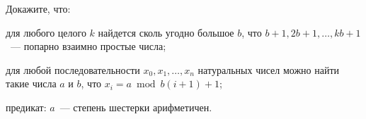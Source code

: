 Докажите, что:
\begin{enumcyr}
    \item для любого целого $k$ найдется сколь угодно большое $b$, что $b + 1, 2 b + 1, \dots, k b +
        1$~--- попарно взаимно простые числа;
    \item для любой последовательности $x_0, x_1, \dots, x_n$ натуральных чисел можно найти такие числа
        $a$ и $b$, что $x_i = a \bmod b (i + 1) + 1$;
    \item предикат: $a$~--- степень шестерки арифметичен.
\end{enumcyr}